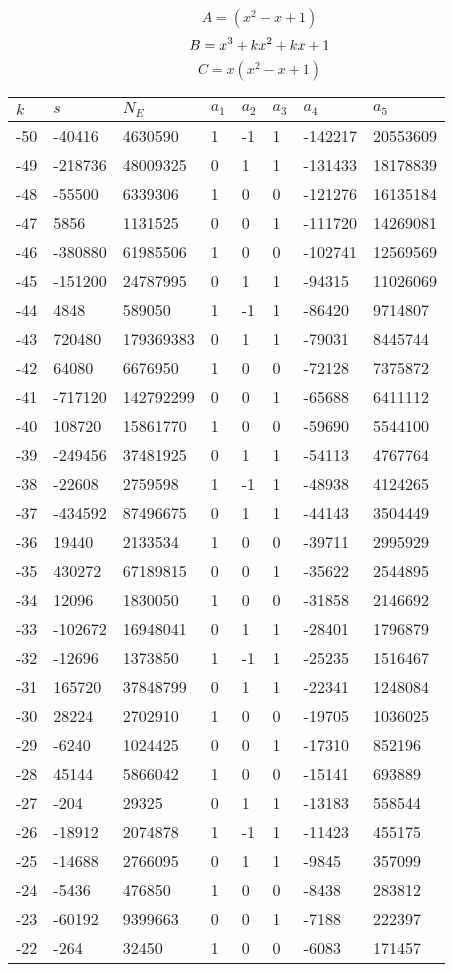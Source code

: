 \documentclass{amsart}
\begin{document}
$$A=(x^2
 - x
 + 1)$$
$$B=x^3
 + k\*x^2
 + k\*x
 + 1$$
$$C=x(x^2
 - x
 + 1)$$
\begin{longtable}{|l|l|l|lllll|}
\hline
$k$ & $s$ & $N_E$ & $a_1$ & $a_2$ & $a_3$ & $a_4$ & $a_5$\\
\hline
-50&-40416&4630590&1&-1&1&-142217&20553609\\
-49&-218736&48009325&0&1&1&-131433&18178839\\
-48&-55500&6339306&1&0&0&-121276&16135184\\
-47&5856&1131525&0&0&1&-111720&14269081\\
-46&-380880&61985506&1&0&0&-102741&12569569\\
-45&-151200&24787995&0&1&1&-94315&11026069\\
-44&4848&589050&1&-1&1&-86420&9714807\\
-43&720480&179369383&0&1&1&-79031&8445744\\
-42&64080&6676950&1&0&0&-72128&7375872\\
-41&-717120&142792299&0&0&1&-65688&6411112\\
-40&108720&15861770&1&0&0&-59690&5544100\\
-39&-249456&37481925&0&1&1&-54113&4767764\\
-38&-22608&2759598&1&-1&1&-48938&4124265\\
-37&-434592&87496675&0&1&1&-44143&3504449\\
-36&19440&2133534&1&0&0&-39711&2995929\\
-35&430272&67189815&0&0&1&-35622&2544895\\
-34&12096&1830050&1&0&0&-31858&2146692\\
-33&-102672&16948041&0&1&1&-28401&1796879\\
-32&-12696&1373850&1&-1&1&-25235&1516467\\
-31&165720&37848799&0&1&1&-22341&1248084\\
-30&28224&2702910&1&0&0&-19705&1036025\\
-29&-6240&1024425&0&0&1&-17310&852196\\
-28&45144&5866042&1&0&0&-15141&693889\\
-27&-204&29325&0&1&1&-13183&558544\\
-26&-18912&2074878&1&-1&1&-11423&455175\\
-25&-14688&2766095&0&1&1&-9845&357099\\
-24&-5436&476850&1&0&0&-8438&283812\\
-23&-60192&9399663&0&0&1&-7188&222397\\
-22&-264&32450&1&0&0&-6083&171457\\

\end{longtable}
\end{document}
